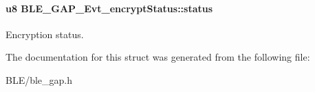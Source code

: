 \paragraph[{\texorpdfstring{status}{status}}]{\setlength{\rightskip}{0pt plus 5cm}u8 B\+L\+E\+\_\+\+G\+A\+P\+\_\+\+Evt\+\_\+encrypt\+Status\+::status}\hypertarget{struct_b_l_e___g_a_p___evt__encrypt_status_a8843d3d93570cb6d7880757126c9d0a5}{}\label{struct_b_l_e___g_a_p___evt__encrypt_status_a8843d3d93570cb6d7880757126c9d0a5}
Encryption status. 

The documentation for this struct was generated from the following file\+:\begin{DoxyCompactItemize}
\item 
B\+L\+E/ble\+\_\+gap.\+h\end{DoxyCompactItemize}

